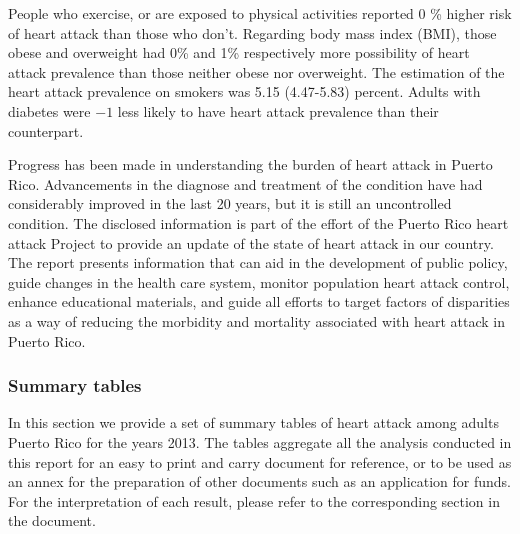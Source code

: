 People who exercise, or are exposed to physical activities reported 0 \% higher risk of heart attack than those who don't.  Regarding body mass index (BMI), those obese and overweight had 0\% and 1\% respectively more possibility of heart attack prevalence than those neither obese nor overweight. The estimation of the heart attack prevalence on smokers was 5.15 (4.47-5.83) percent.  Adults with diabetes were \ensuremath{-1}\5 less likely to have heart attack prevalence than their counterpart.



Progress has been made in understanding the burden of heart attack in Puerto Rico. Advancements in the diagnose and treatment of the condition have had considerably improved in the last 20 years, but it is still an uncontrolled condition. The disclosed information is part of the effort of the Puerto Rico heart attack Project to provide an update of the state of heart attack in our country. The report presents information that can aid in the development of public policy, guide changes in the health care system, monitor population heart attack control, enhance educational materials, and guide all efforts to target factors of disparities as a way of reducing the morbidity and mortality associated with heart attack in Puerto Rico.

\newpage
\subsubsection{Summary tables}
In this section we provide a set of summary tables of heart attack among adults Puerto Rico for the years 2013. The tables aggregate all the analysis conducted in this report for an easy to print and carry document for reference, or to be used as an annex for the preparation of other documents such as an application for funds. For the interpretation of each result, please refer to the corresponding section in the document.


